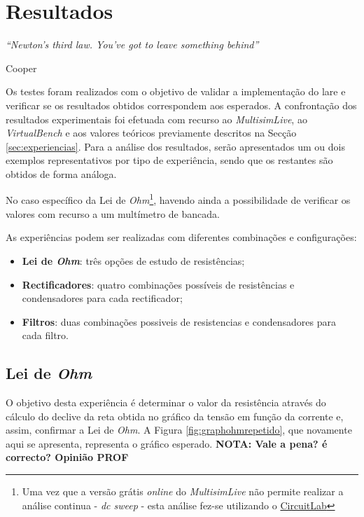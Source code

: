 \label{Capítulo5}
\chapter{Resultados}
\begin{center}
    \textit{``Newton's third law. You've got to leave something behind''}
     
     Cooper
\end{center}
Os testes foram realizados com o objetivo de validar a implementação do \acrshort{lare} e verificar se os resultados obtidos correspondem aos esperados. A confrontação dos resultados experimentais foi efetuada com recurso ao \textit{MultisimLive}, ao \textit{VirtualBench} e aos valores teóricos previamente descritos na Secção \ref{sec:experiencias}. Para a análise dos resultados, serão apresentados um ou dois exemplos representativos por tipo de experiência, sendo que os restantes são obtidos de forma análoga.

No caso específico da Lei de \textit{Ohm}\footnote{Uma vez que a versão grátis \textit{online} do \textit{MultisimLive} não permite realizar a análise continua - \textit{dc sweep} - esta análise fez-se utilizando o \href{https://www.circuitlab.com/}{CircuitLab}}, havendo ainda a possibilidade de verificar os valores com recurso a um multímetro de bancada.

As experiências podem ser realizadas com diferentes combinações e configurações:
\begin{itemize}
	\item \textbf{Lei de \textit{Ohm}}: três opções de estudo de resistências;
	\item \textbf{Rectificadores}: quatro combinações possíveis de resistências e condensadores para cada rectificador;
	\item \textbf{Filtros}: duas combinações possiveis de resistencias e condensadores para cada filtro.
\end{itemize}

\section{Lei de \textit{Ohm}}
\label{sec:resultados_lei_de_ohm}
O objetivo desta experiência é determinar o valor da resistência através do cálculo do declive da reta obtida no gráfico da tensão em função da corrente e, assim, confirmar a Lei de \textit{Ohm}. A Figura \ref{fig:graphohmrepetido}, que novamente aqui se apresenta, representa o gráfico esperado. \textbf{NOTA: Vale a pena? é correcto? Opinião PROF}

